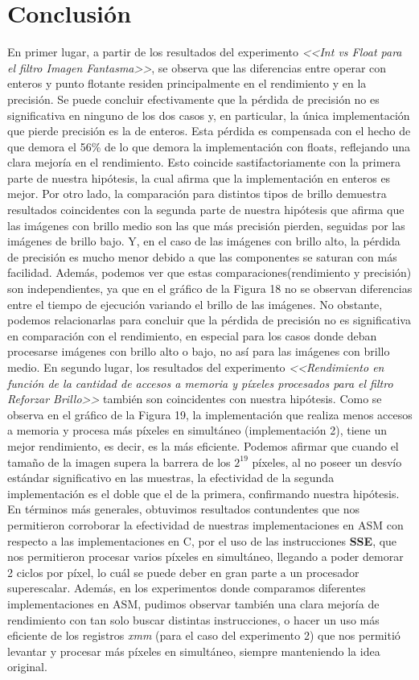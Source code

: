 \documentclass[a4paper]{article}
\begin{document}
\section{Conclusión}
\justify
En primer lugar, a partir de los resultados del experimento \textit{<<Int vs Float para el filtro Imagen Fantasma>>}, se observa que las diferencias  entre operar con enteros y punto flotante residen principalmente en el rendimiento y en la precisión. Se puede concluir efectivamente que la pérdida de precisión no es significativa en ninguno de los dos casos y, en particular, la única implementación que pierde precisión es la de enteros. Esta pérdida es compensada con el hecho de que demora el 56\% de lo que demora la implementación con floats, reflejando una clara mejoría en el rendimiento. Esto coincide sastifactoriamente con la primera parte de nuestra hipótesis, la cual afirma que la implementación en enteros es mejor.
\justify
Por otro lado, la comparación para distintos tipos de brillo demuestra resultados coincidentes con la segunda parte de nuestra hipótesis que afirma que las imágenes con brillo medio son las que más precisión pierden, seguidas por las imágenes de brillo bajo. Y, en el caso de las imágenes con brillo alto, la pérdida de precisión es mucho menor debido a que las componentes se saturan con más facilidad. Además, podemos ver que estas comparaciones(rendimiento y precisión) son independientes, ya que en el gráfico de la Figura 18 no se observan diferencias entre el tiempo de ejecución variando el brillo de las imágenes. No obstante, podemos relacionarlas para concluir que la pérdida de precisión no es significativa en comparación con el rendimiento, en especial para los casos donde deban procesarse imágenes con brillo alto o bajo, no así para las imágenes con brillo medio. 
\justify
En segundo lugar, los resultados del experimento \textit{<<Rendimiento en función de la cantidad de accesos a memoria y píxeles procesados para el filtro Reforzar Brillo>>} también son coincidentes con nuestra hipótesis. Como se observa en el gráfico de la Figura 19, la implementación que realiza menos accesos a memoria y procesa más píxeles en simultáneo (implementación 2), tiene un mejor rendimiento, es decir, es la más eficiente. Podemos afirmar que cuando el tamaño de la imagen supera la barrera de los $2^{19}$ píxeles, al no poseer un desvío estándar significativo en las muestras, la efectividad de la segunda implementación es el doble que el de la primera, confirmando nuestra hipótesis. 
\justify
En términos más generales, obtuvimos resultados contundentes que nos permitieron corroborar la efectividad de nuestras implementaciones en ASM con respecto a las implementaciones en C, por el uso de las instrucciones \textbf{SSE}, que nos permitieron procesar varios píxeles en simultáneo, llegando a poder demorar 2 ciclos por píxel, lo cuál se puede deber en gran parte a un procesador superescalar. Además, en los experimentos donde comparamos diferentes implementaciones en ASM, pudimos observar también una clara mejoría de rendimiento con tan solo buscar distintas instrucciones, o hacer un uso más eficiente de los registros \textit{xmm} (para el caso del experimento 2) que nos permitió levantar y procesar más píxeles en simultáneo, siempre manteniendo la idea original. 
\end{document}
